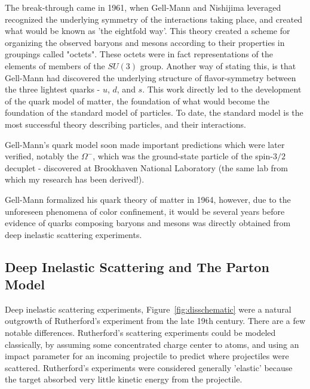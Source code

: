 The break-through came in 1961, when Gell-Mann and Nishijima leveraged
recognized the underlying symmetry of the interactions taking place, and created
what would be known as 'the eightfold way'. This theory created a scheme for
organizing the observed baryons and mesons according to their properties in
groupings called "octets". These octets were in fact representations of the
elements of members of the $SU(3)$ group. Another way of stating this, is that
Gell-Mann had discovered the underlying structure of flavor-symmetry between the
three lightest quarks - $u$, $d$, and $s$. This work directly led to the
development of the quark model of matter, the foundation of what would become
the foundation of the standard model of particles. To date, the standard model
is the most successful theory describing particles, and their interactions.

Gell-Mann's quark model soon made important predictions which were later
verified, notably the $\Omega^{-}$, which was the ground-state particle of the
spin-$3/2$ decuplet - discovered at Brookhaven National Laboratory (the same lab
from which my research has been derived!). 

Gell-Mann formalized his quark theory of matter in 1964, however, due to the
unforeseen phenomena of color confinement, it would be several years before
evidence of quarks composing baryons and mesons was directly obtained from deep
inelastic scattering experiments.

\clearpage
\subsection{Deep Inelastic Scattering and The Parton Model}

Deep inelastic scattering experiments, Figure~\ref{fig:disschematic} were a
natural outgrowth of Rutherford's experiment from the late 19th century. There
are a few notable differences.  Rutherford's scattering experiments could be
modeled classically, by assuming some concentrated charge center to atoms, and
using an impact parameter for an incoming projectile to predict where
projectiles were scattered. Rutherford's experiments were considered generally
'elastic' because the target absorbed very little kinetic energy from the
projectile.

